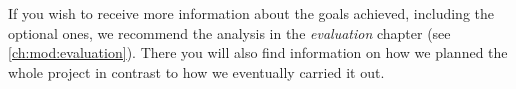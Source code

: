 If you wish to receive more information about the goals achieved, including the optional ones, we recommend the analysis in the \textit{evaluation} chapter (see \cref{ch:mod:evaluation}). There you will also find information on how we planned the whole project in contrast to how we eventually carried it out.




















